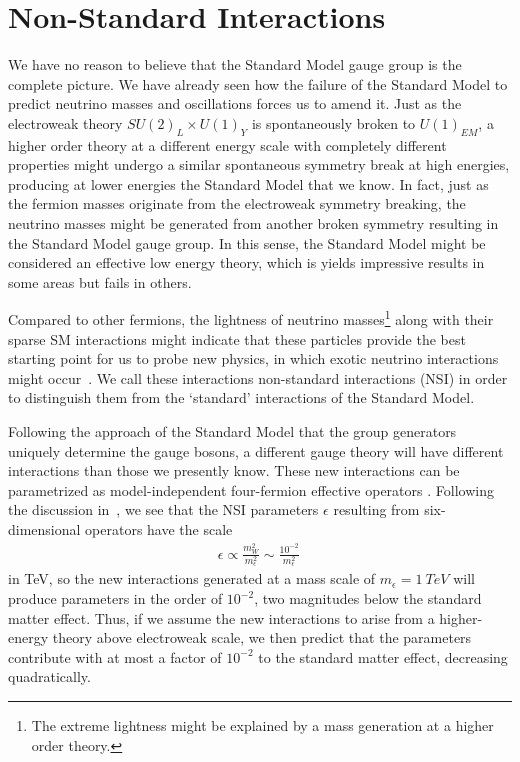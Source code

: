 \section{Non-Standard Interactions}\label{sec:nsiTheory}
We have no reason to believe that the Standard Model 
gauge group is the complete picture. We have already seen how the failure of the Standard Model to predict neutrino masses and 
oscillations forces us to amend it. 
Just as the electroweak theory $SU(2)_L \times U(1)_Y$ is 
spontaneously broken to $U(1)_{EM}$, a higher order theory at a different energy scale with completely different
properties might undergo a similar spontaneous symmetry break at high energies, 
producing at lower energies the Standard Model that we know. In fact, 
just as the fermion masses originate from the electroweak symmetry breaking, the neutrino masses might be generated from 
another broken symmetry resulting in the Standard Model gauge group.
In this sense, the Standard Model might be considered 
an effective low energy theory, which is yields impressive results in some areas but fails in others. 

Compared to other fermions, the lightness of neutrino masses\footnote{The extreme lightness might be explained by a mass generation at a higher order theory.} along with their sparse SM interactions might 
indicate that these particles provide the best starting point for us to probe new physics, in which exotic neutrino interactions might occur~\cite{gavela2009}. We call these interactions non-standard interactions (NSI) in order to 
distinguish them from the `standard' interactions of the Standard Model.
 
Following the approach of the Standard Model that the group generators uniquely determine the gauge bosons, a different gauge
theory will have different interactions than those we presently know. These new interactions can be parametrized as model-independent four-fermion effective operators \cite{salvadoNSI,nsiFarzan}.
Following the discussion in~\cite{tommyNSI}, we see that the NSI parameters $\epsilon$ resulting from six-dimensional operators have the scale
\begin{align}
    \epsilon \propto \frac{m_W^2}{m_{\epsilon}^2} \sim \frac{10^{-2}}{m_\epsilon^2}\,
\end{align} 
in \si{\TeV}, so the new interactions generated at a mass scale of $m_\epsilon = \SI{1}{TeV}$ will produce parameters in the order of $10^{-2}$, 
two magnitudes below the standard matter effect. Thus, if we assume the new interactions to arise from a higher-energy theory above electroweak scale, 
we then predict that the parameters contribute with at most a factor of $10^{-2}$ to the standard matter effect, decreasing quadratically.


